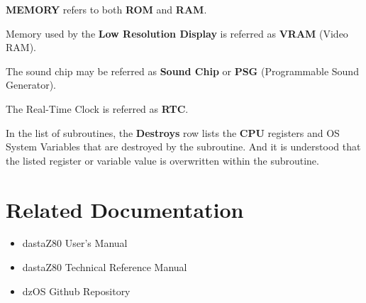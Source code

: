 \documentclass[a4paper,11pt]{article}
\begin{document}
    \textbf{MEMORY} refers to both \textbf{ROM} and \textbf{RAM}.

    Memory used by the \textbf{Low Resolution Display} is referred as
    \textbf{VRAM} (Video RAM).

    The sound chip may be referred as \textbf{Sound Chip} or \textbf{PSG}
    (Programmable Sound Generator).

    The Real-Time Clock is referred as \textbf{RTC}.

    In the list of subroutines, the \textbf{Destroys} row lists the \textbf{CPU}
    registers and OS System Variables that are destroyed by the subroutine. And 
    it is understood that the listed register or variable value is overwritten
    within the subroutine.

    \pagebreak
    \section*{Related Documentation}
    \begin{itemize}
        \item dastaZ80 User's Manual\cite{dastaz80userman}
        \item dastaZ80 Technical Reference Manual\cite{dastaz80techman}
        \item dzOS Github Repository\cite{dastaZ80github}
    \end{itemize}

    \pagebreak
    \tableofcontents

    \pagebreak
    \pagestyle{fancy}
    \fancyhf{}
    \fancyfoot[R]{\thepage}
    \setcounter{page}{1}
    
    
    \pagebreak
    
    \pagebreak
    \begingroup
        \let\clearpage\relax
\end{document}
